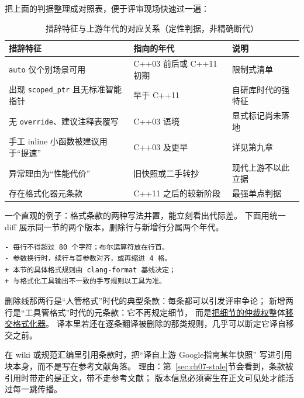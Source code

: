 \documentclass[12pt,a4paper,fontset=fandol]{ctexbook}
\newcommand{\cpp}[1]{C++#1}
\newcommand{\Tp}[1]{\texttt{#1}}
\newcommand{\Lang}[1]{\textsf{#1}}
\newcommand{\DomGo}{\Lang{Google}}
\begin{document}
把上面的判据整理成对照表，便于评审现场快速过一遍：

\begin{table}[htbp]
  \centering
  \small
  \begin{tabularx}{0.9\textwidth}{@{}>{\raggedright\arraybackslash}p{}
    >{\raggedright\arraybackslash}X >{\raggedright\arraybackslash}X@{}}
    \toprule
    措辞特征 & 指向的年代 & 说明 \\
    \midrule
    \Tp{auto} 仅个别场景可用 & \cpp{03} 前后或 \cpp{11} 初期 & 限制式清单 \\
    出现 \Tp{scoped\_ptr} 且无标准智能指针 & 早于 \cpp{11} & 自研库时代的强特征 \\
    无 \Tp{override}、建议注释表覆写 & \cpp{03} 语境 & 显式标记尚未落地 \\
    手工 inline 小函数被建议用于``提速'' & \cpp{03} 及更早 & 详见第九章 \\
    异常理由为``性能代价'' & 旧快照或二手转抄 & 现代上游不以此立据 \\
    存在格式化器元条款 & \cpp{11} 之后的较新阶段 & 最强单点判据 \\
    \bottomrule
  \end{tabularx}
  \caption{措辞特征与上游年代的对应关系（定性判据，非精确断代）}\label{tab:ch07-dating}
\end{table}

一个直观的例子：格式条款的两种写法并置，能立刻看出代际差。
下面用统一 diff 展示同一节的两个版本，删除行与新增行分属两个年代。
\begin{lstlisting}[style=diffstyle]
- 每行不得超过 80 个字符；布尔运算符放在行首。
- 参数换行时，续行与首参数对齐，或再缩进 4 格。
+ 本节的具体格式规则由 clang-format 基线决定；
+ 与格式化工具输出不一致的手写规则以工具为准。
\end{lstlisting}

删除线那两行是``人管格式''时代的典型条款：每条都可以引发评审争论；
新增两行是``工具管格式''时代的元条款：它不再规定细节，
而是\underline{把细节的仲裁权}整体\underline{移交格式化器}。
译本里若还在逐条翻译被删除的那类规则，几乎可以断定它译自移交之前。

\begin{bestpractice}[title={断代结论要写进引用格式}]
  在 wiki 或规范汇编里引用条款时，把``译自上游 \DomGo 指南某年快照''
  写进引用块本身，而不是写在参考文献角落。
  理由：第~\ref{sec:ch07-stale}节会看到，条款被引用时带走的是正文，带不走参考文献；
  版本信息必须寄生在正文可见处才能活过每一跳传播。
\end{bestpractice}
\end{document}
